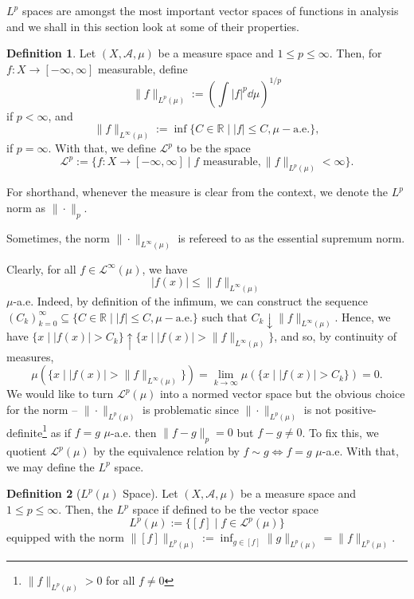 \documentclass[
]{article}
\theoremstyle{definition}
\theoremstyle{definition}
\newtheorem{definition}{Definition}[section]
\begin{document}
\(L^p\) spaces are amongst the most important vector spaces of functions
in analysis and we shall in this section look at some of their
properties.

\begin{definition}
  Let \((X, \mathcal{A}, \mu)\) be a measure space and \(1 \le p \le \infty\).  
  Then, for \(f : X \to [- \infty, \infty]\) measurable, define 
  \[\|f\|_{L^p(\mu)} := \left(\int |f|^p \dd \mu\right)^{1 / p}\]
  if \(p < \infty\), and
  \[\|f\|_{L^\infty(\mu)} := \inf \{ C \in \mathbb{R} \mid |f| \le C, \mu-\text{a.e.}\},\]
  if \(p = \infty\). With that, we define \(\mathcal{L}^p\) to be the space
  \[\mathcal{L}^p := \{f : X \to [-\infty, \infty] \mid f \text{ measurable}, 
    \|f\|_{L^p(\mu)} < \infty\}.\]
\end{definition}

For shorthand, whenever the measure is clear from the context, we denote
the \(L^p\) norm as \(\| \cdot \|_p\).

Sometimes, the norm \(\| \cdot \|_{L^\infty(\mu)}\) is refereed to as
the essential supremum norm.

Clearly, for all \(f \in \mathcal{L}^\infty(\mu)\), we have
\[|f(x)| \le \|f\|_{L^\infty(\mu)}\] \(\mu\)-a.e. Indeed, by definition
of the infimum, we can construct the sequence
\((C_k)_{k = 0}^\infty \subseteq \{ C \in \mathbb{R} \mid |f| \le C, \mu-\text{a.e.}\}\)
such that \(C_k \downarrow \|f\|_{L^\infty(\mu)}\). Hence, we have
\(\{x \mid |f(x)| > C_k\} \uparrow \{x \mid |f(x)| > \|f\|_{L^\infty(\mu)}\}\),
and so, by continuity of measures,
\[\mu(\{x \mid |f(x)| > \|f\|_{L^\infty(\mu)}\}) = 
  \lim_{k \to \infty}\mu(\{x \mid |f(x)| > C_k\}) = 0.\] We would like
to turn \(\mathcal{L}^p(\mu)\) into a normed vector space but the
obvious choice for the norm -- \(\| \cdot \|_{L^p(\mu)}\) is problematic
since \(\| \cdot \|_{L^p(\mu)}\) is not
positive-definite\footnote{\(\| f \|_{L^p(\mu)} > 0\) for
all \(f \neq 0\)} as if \(f = g\) \(\mu\)-a.e. then \(\|f - g\|_p = 0\)
but \(f - g \neq 0\). To fix this, we quotient \(\mathcal{L}^p(\mu)\) by
the equivalence relation by \(f \sim g \iff f = g\) \(\mu\)-a.e. With
that, we may define the \(L^p\) space.

\begin{definition}[\(L^p(\mu)\) Space]
  Let \((X, \mathcal{A}, \mu)\) be a measure space and \(1 \le p \le \infty\). 
  Then, the \(L^p\) space if defined to be the vector space
  \[L^p(\mu) := \{[f] \mid f \in \mathcal{L}^p(\mu)\}\]
  equipped with the norm \(\|[f]\|_{L^p(\mu)} := \inf_{g \in [f]} \|g\|_{L^p(\mu)} 
  = \|f\|_{L^p(\mu)}\).
\end{definition}
\end{document}
